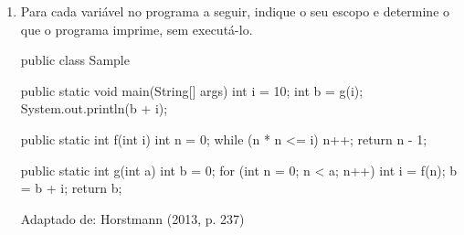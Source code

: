 \documentclass[onecolumn,a4paper,10pt]{report}
\newcommand{\+}{\, + \,}
\newcommand{\<}{\hspace*{-0.4cm}}
\begin{document}
\begin{enumerate}
\item Para cada variável no programa a seguir, indique o seu escopo e determine o que o programa imprime, sem executá-lo.
\begin{javacode}
public class Sample {

  public static void main(String[] args) {
    int i = 10;
    int b = g(i);
    System.out.println(b + i);
  }

  public static int f(int i) {
    int n = 0;
    while (n * n <= i) n++;
    return n - 1;
  }

  public static int g(int a) {
    int b = 0;
    for (int n = 0; n < a; n++) {
      int i = f(n);
      b = b + i;
    }
    return b;
  }
}
\end{javacode}
{\tiny Adaptado de: Horstmann (2013, p. 237)}

\end{enumerate}



~\\

\end{document}

